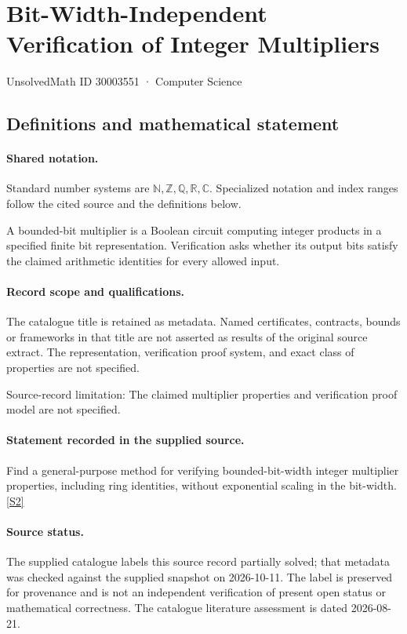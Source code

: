\documentclass[11pt]{article}
\newcommand{\sref}[2]{\hyperlink{source:#1:#2}{[S#2]}}
\begin{document}
\setcounter{section}{30003550}
\section{Bit-Width-Independent Verification of Integer Multipliers}\label{30003551}
{\small\sffamily UnsolvedMath ID 30003551 · Computer Science}
\subsection{Definitions and mathematical statement}

\paragraph{Shared notation.}Standard number systems are $\mathbb N,\mathbb Z,\mathbb Q,\mathbb R,\mathbb C$. Specialized notation and index ranges follow the cited source and the definitions below.


A bounded-bit multiplier is a Boolean circuit computing integer products in a specified finite bit representation. Verification asks whether its output bits satisfy the claimed arithmetic identities for every allowed input.
\paragraph{Record scope and qualifications.}
The catalogue title is retained as metadata. Named certificates, contracts, bounds or frameworks in that title are not asserted as results of the original source extract.
The representation, verification proof system, and exact class of properties are not specified.

Source-record limitation: The claimed multiplier properties and verification proof model are not specified.
\paragraph{Statement recorded in the supplied source.}
Find a general-purpose method for verifying bounded-bit-width integer multiplier properties, including ring identities, without exponential scaling in the bit-width. \sref{30003551}{2}
\paragraph{Source status.}
The supplied catalogue labels this source record partially solved; that metadata was checked against the supplied snapshot on 2026-10-11. The label is preserved for provenance and is not an independent verification of present open status or mathematical correctness. The catalogue literature assessment is dated 2026-08-21.
\end{document}

